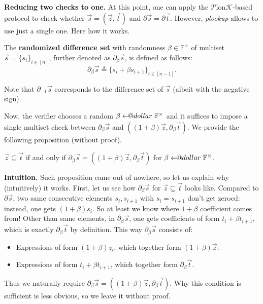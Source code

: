\documentclass{lookup-template}
\makeatletter
\newcommand\leftarrowS{\leftarrow\joinrel\smalldollar}
\newcommand{\smalldollar}{\mathrel{\mathpalette\small@dollar\relax}}
\newcommand{\small@dollar}[2]{%
  \vcenter{\hbox{%
    $#1\textnormal{\fontsize{0.7\dimexpr\f@size pt}{0}\selectfont\$}$%
  }}%
}
\makeatother
\begin{document}
\textbf{Reducing two checks to one.} At this point, one can apply the
$\mathcal{P}$lon$\mathcal{K}$-based protocol to check whether $\vec{s} =
(\vec{z}, \vec{t})$ and $\partial\vec{s} = \partial\vec{t}$. However,
\textit{plookup} allows to use just a single one. Here how it works.

\begin{definition}
    The \textbf{randomized difference set} with randomness $\beta \in
    \mathbb{F}^{\times}$ of multiset $\vec{s}=\{s_i\}_{i \in [n]}$, further
    denoted as $\partial_{\beta}\vec{s}$, is defined as follows:
    \begin{equation*}
        \partial_{\beta}\vec{s} \triangleq \{s_i+\beta s_{i+1}\}_{i \in [n-1]}.
    \end{equation*}
\end{definition}

\begin{remark}
    Note that $\partial_{-1}\vec{s}$ corresponds to the difference set
    of $\vec{s}$ (albeit with the negative sign).
\end{remark}

Now, the verifier chooses a random $\beta \leftarrowS \mathbb{F}^{\times}$ and
it suffices to impose a single multiset check between $\partial_{\beta}\vec{s}$
and $((1+\beta)\vec{z},\partial_{\beta}\vec{t})$. We provide the following
proposition (without proof).
\begin{proposition}
    $\vec{z} \subseteq \vec{t}$ if and only if $\partial_{\beta}\vec{s} =
    ((1+\beta)\vec{z},\partial_{\beta}\vec{t})$ for $\beta \leftarrowS
    \mathbb{F}^{\times}$.
\end{proposition}

\textbf{Intuition.} Such proposition came out of nowhere, so let us explain why
(intuitively) it works. First, let us see how $\partial_{\beta}\vec{s}$ for
$\vec{z} \subseteq \vec{t}$ looks like. Compared to $\partial\vec{s}$, two same
consecutive elements $s_i,s_{i+1}$ with $s_i=s_{i+1}$ don't get zeroed: instead,
one gets $(1+\beta)s_i$. So at least we know where $1+\beta$ coefficient comes
from! Other than same elements, in $\partial_{\beta}\vec{s}$, one gets
coefficients of form $t_i+\beta t_{i+1}$, which is exactly
$\partial_{\beta}\vec{t}$ by definition. This way $\partial_{\beta}\vec{s}$ consists of:
\begin{itemize}
    \item Expressions of form $(1+\beta)z_i$, which together form $(1+\beta)\vec{z}$.
    \item Expressions of form $t_i+\beta t_{i+1}$, which together form
    $\partial_{\beta}\vec{t}$.
\end{itemize}
Thus we naturally require $\partial_{\beta}\vec{s} =
((1+\beta)\vec{z},\partial_{\beta}\vec{t})$. Why this condition is sufficient is
less obvious, so we leave it without proof.
\end{document}
